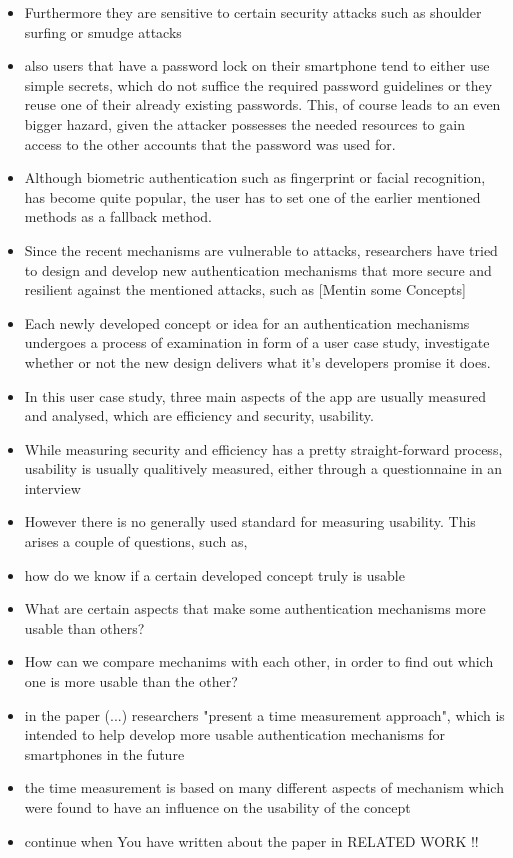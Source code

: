 \begin{itemize}
    \item Furthermore they are sensitive to certain security attacks such as shoulder surfing or smudge attacks 
    \item also users that have a password lock on their smartphone tend to either use simple secrets, which do not suffice the required password guidelines or they reuse one of their already existing passwords. This, of course leads to an even bigger hazard, given the attacker possesses the needed resources to gain access to the other accounts that the password was used for.
    \item Although biometric authentication such as fingerprint or facial recognition, has become quite popular, the user has to set one of the earlier mentioned methods as a fallback method.
    \item Since the recent mechanisms are vulnerable to attacks, researchers have tried to design and develop new authentication mechanisms that more secure and resilient against the mentioned attacks, such as [Mentin some Concepts]
    \item Each newly developed concept or idea for an authentication mechanisms undergoes a process of examination in form of a user case study, investigate whether or not the new design delivers what it's developers promise it does.
    \item In this user case study, three main aspects of the app are usually measured and analysed, which are efficiency and security, usability.
    \item While measuring security and efficiency has a pretty straight-forward process, usability is usually qualitively measured, either through a questionnaine in an interview
    \item However there is no generally used standard for measuring usability. This arises a couple of questions, such as,
    \item how do we know if a certain developed concept truly is usable 
    \item What are certain aspects that make some authentication mechanisms more usable than others? 
    \item How can we compare mechanims with each other, in order to find out which one is more usable than the other? 
    \item in the paper (...) researchers "present a time measurement approach", which is intended to help develop more usable authentication mechanisms for smartphones in the future
    \item the time measurement is based on many different aspects of mechanism which were found to have an influence on the usability of the concept
    \item continue when You have written about the paper in RELATED WORK !! 
    

\end{itemize}
